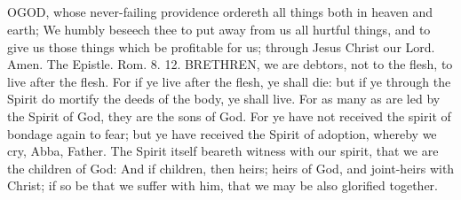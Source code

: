 \subsection{}
OGOD, whose never-failing providence ordereth all things both in heaven and earth; We humbly beseech thee to put away from us all hurtful things, and to give us those things which be profitable for us; through Jesus Christ our Lord. Amen.
The Epistle. Rom. 8. 12.
BRETHREN, we are debtors, not to the flesh, to live after the flesh. For if ye live after the flesh, ye shall die: but if ye through the Spirit do mortify the deeds of the body, ye shall live. For as many as are led by the Spirit of God, they are the sons of God. For ye have not received the spirit of bondage again to fear; but ye have received the Spirit of adoption, whereby we cry, Abba, Father. The Spirit itself beareth witness with our spirit, that we are the children of God: And if children, then heirs; heirs of God, and joint-heirs with Christ; if so be that we suffer with him, that we may be also glorified together.

\subsection{}


